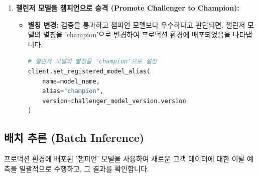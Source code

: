 \documentclass[11pt,a4paper]{article}
\theoremstyle{definition}
\begin{document}
\begin{enumerate}
    \item \textbf{챌린저 모델을 챔피언으로 승격 (Promote Challenger to Champion):}
    \begin{itemize}
        \item \textbf{별칭 변경:} 검증을 통과하고 챔피언 모델보다 우수하다고 판단되면, 챌린저 모델의 별칭을 'champion'으로 변경하여 프로덕션 환경에 배포되었음을 나타냅니다.
        \begin{lstlisting}[language=Python, caption={챌린저 모델을 챔피언으로 승격}, label={lst:promote_to_champion}]
# 챌린저 모델의 별칭을 'champion'으로 설정
client.set_registered_model_alias(
    name=model_name,
    alias="champion",
    version=challenger_model_version.version
)
\end{lstlisting}
    \end{itemize}
\end{enumerate}

\subsection{배치 추론 (Batch Inference)}

\begin{summarybox}
프로덕션 환경에 배포된 '챔피언' 모델을 사용하여 새로운 고객 데이터에 대한 이탈 예측을 일괄적으로 수행하고, 그 결과를 확인합니다.
\end{summarybox}
\end{document}
